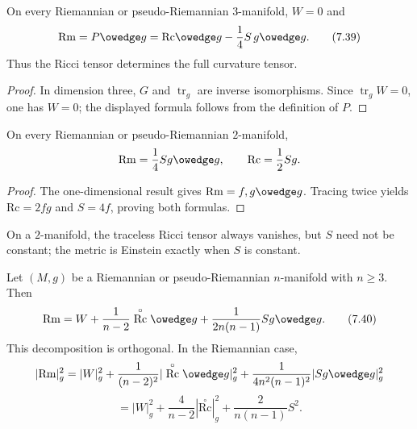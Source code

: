 \begin{corollary}
\label{cor:ricci-determines-curvature-dim3}
On every Riemannian or pseudo-Riemannian $3$-manifold, $W=0$ and
\begin{equation}
\mathrm{Rm}=P\owedge g
=\mathrm{Rc}\owedge g-\frac14S\,g\owedge g. \tag{7.39}
\end{equation}
Thus the Ricci tensor determines the full curvature tensor.
\end{corollary}

\begin{proof}
\sketch
In dimension three, $G$ and $\operatorname{tr}_g$ are inverse isomorphisms.
Since $\operatorname{tr}_gW=0$, one has $W=0$; the displayed formula follows
from the definition of $P$.
\end{proof}

\begin{corollary}
\label{cor:curvature-tensor-dim-2}
On every Riemannian or pseudo-Riemannian $2$-manifold,
\[
\mathrm{Rm}=\frac14Sg\owedge g,
\qquad
\mathrm{Rc}=\frac12Sg.
\]
\end{corollary}

\begin{proof}
\sketch
The one-dimensional result gives $\mathrm{Rm}=f,g\owedge g$.  Tracing twice
yields $\mathrm{Rc}=2fg$ and $S=4f$, proving both formulas.
\end{proof}

On a $2$-manifold, the traceless Ricci tensor always vanishes, but $S$ need
not be constant; the metric is Einstein exactly when $S$ is constant.

\begin{proposition}
\label{prop:ricci-decomposition}
Let $(M,g)$ be a Riemannian or pseudo-Riemannian $n$-manifold with $n\geq3$.
Then
\begin{equation}
\mathrm{Rm}=W+\frac1{n-2}\stackrel{\circ}{\mathrm{Rc}}\owedge g
+\frac1{2n(n-1)}Sg\owedge g. \tag{7.40}
\end{equation}
This decomposition is orthogonal.  In the Riemannian case,
\[
|\mathrm{Rm}|_g^2=|W|_g^2
+\frac1{(n-2)^2}|\stackrel{\circ}{\mathrm{Rc}}\owedge g|_g^2
+\frac1{4n^2(n-1)^2}|Sg\owedge g|_g^2
\]
\begin{equation}
=|W|_g^2+\frac4{n-2}|\stackrel{\circ}{\mathrm{Rc}}|_g^2
+\frac2{n(n-1)}S^2. \tag{7.41}
\end{equation}
\end{proposition}

